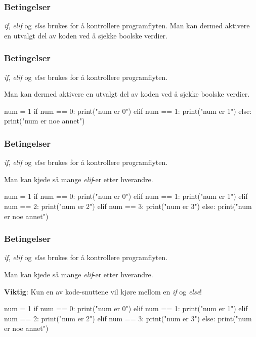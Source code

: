 \begin{frame}
    \frametitle{Betingelser}

    \textit{if}, \textit{elif} og \textit{else} brukes for å kontrollere programflyten. Man kan dermed aktivere en utvalgt del av koden ved å sjekke boolske verdier. 

\end{frame}

\begin{frame}[fragile]
    \frametitle{Betingelser}

    \textit{if}, \textit{elif} og \textit{else} brukes for å kontrollere programflyten. 
    
    Man kan dermed aktivere en utvalgt del av koden ved å sjekke boolske verdier. 

\begin{python}
num = 1
if num == 0:
    print("num er 0")
elif num == 1:
    print("num er 1")
else:
    print("num er noe annet")
\end{python}

\end{frame}

\begin{frame}[fragile]
    \frametitle{Betingelser}

    \textit{if}, \textit{elif} og \textit{else} brukes for å kontrollere programflyten. 

    Man kan kjede så mange \textit{elif}-er etter hverandre. 

\begin{python}
num = 1
if num == 0:
    print("num er 0")
elif num == 1:
    print("num er 1")
elif num == 2:
    print("num er 2")
elif num == 3:
    print("num er 3")
else:
    print("num er noe annet")
\end{python}

\end{frame}

\begin{frame}[fragile]
    \frametitle{Betingelser}

    \textit{if}, \textit{elif} og \textit{else} brukes for å kontrollere programflyten. 

    Man kan kjede så mange \textit{elif}-er etter hverandre. 

    \textbf{Viktig}: Kun en av kode-snuttene vil kjøre mellom en \textit{if} og \textit{else}! 

\begin{python}
num = 1
if num == 0:
    print("num er 0")
elif num == 1:
    print("num er 1")
elif num == 2:
    print("num er 2")
elif num == 3:
    print("num er 3")
else:
    print("num er noe annet")
\end{python}

\end{frame}

